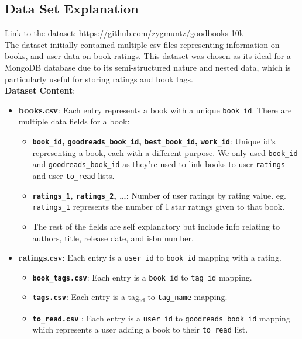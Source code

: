 \documentclass[11pt]{article}
\begin{document}
\subsection{Data Set Explanation}
\label{sec:orga8db179}
Link to the dataset: \url{https://github.com/zygmuntz/goodbooks-10k}\\
\linebreak
The dataset initially contained multiple csv files representing information on books, and user data on book ratings. This dataset was chosen as its ideal for a MongoDB database due to its semi-structured nature and nested data, which is particularly useful for storing ratings and book tags. \\
\linebreak
\textbf{Dataset Content}:
\begin{itemize}
\item \textbf{books.csv}: Each entry represents a book with a unique \texttt{book\_id}. There are multiple data fields for a book:
\begin{itemize}
\item \textbf{\texttt{book\_id}, \texttt{goodreads\_book\_id}, \texttt{best\_book\_id}, \texttt{work\_id}}: Unique id’s representing a book, each with a different purpose. We only used \texttt{book\_id} and \texttt{goodreads\_book\_id} as they’re used to link books to user \texttt{ratings} and user \texttt{to\_read} lists.
\item \textbf{\texttt{ratings\_1}, \texttt{ratings\_2}, …}: Number of user ratings by rating value. eg. \texttt{ratings\_1} represents the number of 1 star ratings given to that book.
\item The rest of the fields are self explanatory but include info relating to authors, title, release date, and isbn number.
\end{itemize}
\item \textbf{ratings.csv}: Each entry is a \texttt{user\_id} to \texttt{book\_id} mapping with a rating.
\begin{itemize}
\item \textbf{\texttt{book\_tags.csv}}: Each entry is a \texttt{book\_id} to \texttt{tag\_id} mapping.
\item \textbf{\texttt{tags.csv}}: Each entry is a tag\textsubscript{id} to \texttt{tag\_name} mapping.
\item \textbf{\texttt{to\_read.csv}} : Each entry is a \texttt{user\_id} to \texttt{goodreads\_book\_id} mapping which represents a user adding a book to their \texttt{to\_read} list.
\end{itemize}
\end{itemize}
\end{document}
